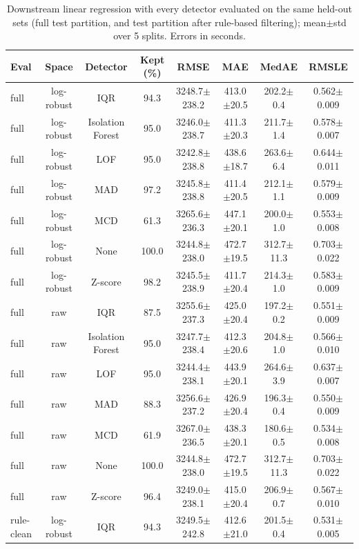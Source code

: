 \begin{table}[!t]
\caption{Downstream linear regression with every detector evaluated on the same held-out sets (full test partition, and test partition after rule-based filtering); mean$\pm$std over 5 splits. Errors in seconds.}
\label{tab:ext_downstream}
\centering
\setlength{\tabcolsep}{3pt}
\footnotesize
\begin{tabular}{lccccccc}
\hline
Eval & Space & Detector & Kept (\%) & RMSE & MAE & MedAE & RMSLE \\
\hline
full & log-robust & IQR & 94.3 & 3248.7$\pm$238.2 & 413.0$\pm$20.5 & 202.2$\pm$0.4 & 0.562$\pm$0.009 \\
full & log-robust & Isolation Forest & 95.0 & 3246.0$\pm$238.7 & 411.3$\pm$20.3 & 211.7$\pm$1.4 & 0.578$\pm$0.007 \\
full & log-robust & LOF & 95.0 & 3242.8$\pm$238.8 & 438.6$\pm$18.7 & 263.6$\pm$6.4 & 0.644$\pm$0.011 \\
full & log-robust & MAD & 97.2 & 3245.8$\pm$238.8 & 411.4$\pm$20.5 & 212.1$\pm$1.1 & 0.579$\pm$0.009 \\
full & log-robust & MCD & 61.3 & 3265.6$\pm$236.3 & 447.1$\pm$20.1 & 200.0$\pm$1.0 & 0.553$\pm$0.008 \\
full & log-robust & None & 100.0 & 3244.8$\pm$238.0 & 472.7$\pm$19.5 & 312.7$\pm$11.3 & 0.703$\pm$0.022 \\
full & log-robust & Z-score & 98.2 & 3245.5$\pm$238.9 & 411.7$\pm$20.4 & 214.3$\pm$1.0 & 0.583$\pm$0.009 \\
full & raw & IQR & 87.5 & 3255.6$\pm$237.3 & 425.0$\pm$20.4 & 197.2$\pm$0.2 & 0.551$\pm$0.009 \\
full & raw & Isolation Forest & 95.0 & 3247.7$\pm$238.4 & 412.3$\pm$20.6 & 204.8$\pm$1.0 & 0.566$\pm$0.010 \\
full & raw & LOF & 95.0 & 3244.4$\pm$238.1 & 443.9$\pm$20.1 & 264.6$\pm$3.9 & 0.637$\pm$0.007 \\
full & raw & MAD & 88.3 & 3256.6$\pm$237.2 & 426.9$\pm$20.4 & 196.3$\pm$0.4 & 0.550$\pm$0.009 \\
full & raw & MCD & 61.9 & 3267.0$\pm$236.5 & 438.3$\pm$20.1 & 180.6$\pm$0.5 & 0.534$\pm$0.008 \\
full & raw & None & 100.0 & 3244.8$\pm$238.0 & 472.7$\pm$19.5 & 312.7$\pm$11.3 & 0.703$\pm$0.022 \\
full & raw & Z-score & 96.4 & 3249.0$\pm$238.1 & 415.0$\pm$20.4 & 206.9$\pm$0.7 & 0.567$\pm$0.010 \\
rule-clean & log-robust & IQR & 94.3 & 3249.5$\pm$242.8 & 412.6$\pm$21.0 & 201.5$\pm$0.4 & 0.531$\pm$0.005 \\

\end{tabular}
\end{table}
